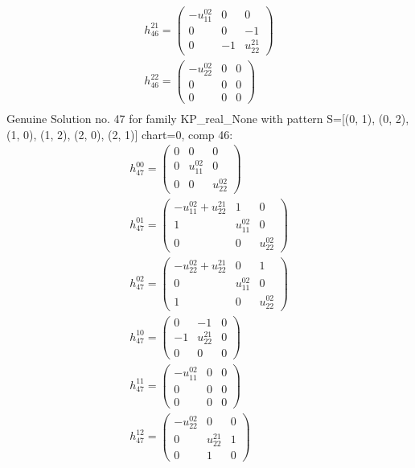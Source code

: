 \documentclass[a4paper, 11pt, twoside, onecolumn]{article}
\begin{document}
\begin{landscape}
\begin{gather*}
	 h_{46}^{21}=\begin{pmatrix}- u^{02}_{11} & 0 & 0\\0 & 0 & -1\\0 & -1 & u^{21}_{22}\end{pmatrix}\\ 
	 h_{46}^{22}=\begin{pmatrix}- u^{02}_{22} & 0 & 0\\0 & 0 & 0\\0 & 0 & 0\end{pmatrix}\\ 
\end{gather*} 
Genuine Solution no. 47 for family KP_real_None with pattern S=[(0, 1), (0, 2), (1, 0), (1, 2), (2, 0), (2, 1)] chart=0, comp 46: 
\begin{gather*} 
	 h_{47}^{00}=\begin{pmatrix}0 & 0 & 0\\0 & u^{02}_{11} & 0\\0 & 0 & u^{02}_{22}\end{pmatrix}\\ 
	 h_{47}^{01}=\begin{pmatrix}- u^{02}_{11} + u^{21}_{22} & 1 & 0\\1 & u^{02}_{11} & 0\\0 & 0 & u^{02}_{22}\end{pmatrix}\\ 
	 h_{47}^{02}=\begin{pmatrix}- u^{02}_{22} + u^{21}_{22} & 0 & 1\\0 & u^{02}_{11} & 0\\1 & 0 & u^{02}_{22}\end{pmatrix}\\ 
	 h_{47}^{10}=\begin{pmatrix}0 & -1 & 0\\-1 & u^{21}_{22} & 0\\0 & 0 & 0\end{pmatrix}\\ 
	 h_{47}^{11}=\begin{pmatrix}- u^{02}_{11} & 0 & 0\\0 & 0 & 0\\0 & 0 & 0\end{pmatrix}\\ 
	 h_{47}^{12}=\begin{pmatrix}- u^{02}_{22} & 0 & 0\\0 & u^{21}_{22} & 1\\0 & 1 & 0\end{pmatrix}\\ 

\end{gather*}
\end{landscape}
\end{document}
